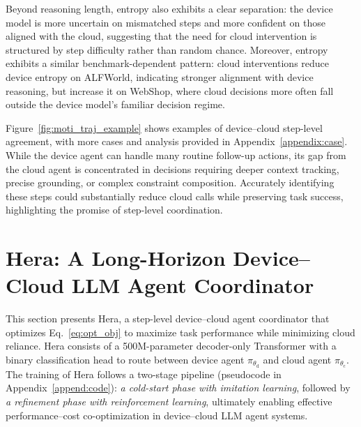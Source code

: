\documentclass{article}
\newcommand{\name}{Hera\xspace}
\begin{document}
Beyond reasoning length, entropy also exhibits a clear separation: the device model is more uncertain on mismatched steps and more confident on those aligned with the cloud, suggesting that the need for cloud intervention is structured by step difficulty rather than random chance.
Moreover, entropy exhibits a similar benchmark-dependent pattern: cloud interventions reduce device entropy on ALFWorld, indicating stronger alignment with device reasoning, but increase it on WebShop, where cloud decisions more often fall outside the device model’s familiar decision regime.

Figure~\ref{fig:moti_traj_example} shows examples of device--cloud step-level agreement, with more cases and analysis provided in Appendix~\ref{appendix:case}.
While the device agent can handle many routine follow-up actions, its gap from the cloud agent is concentrated in decisions requiring deeper context tracking, precise grounding, or complex constraint composition. Accurately identifying these steps could substantially reduce cloud calls while preserving task success, highlighting the promise of step-level coordination.

\section{\name: A Long-Horizon Device--Cloud LLM Agent Coordinator}
\label{sec:hera}

This section presents \name, a step-level device--cloud agent coordinator that optimizes Eq.~\ref{eq:opt_obj} to maximize task performance while minimizing cloud reliance.
\name consists of a 500M-parameter decoder-only Transformer with a binary classification head to route between device agent $\pi_{\theta_\mathrm{d}}$ and cloud agent $\pi_{\theta_\mathrm{c}}$. The training of \name follows a two-stage pipeline (pseudocode in Appendix~\ref{append:code}): \textit{a cold-start phase with imitation learning}, followed by \textit{a refinement phase with reinforcement learning}, ultimately enabling effective performance--cost co-optimization in device--cloud LLM agent systems.
\end{document}
